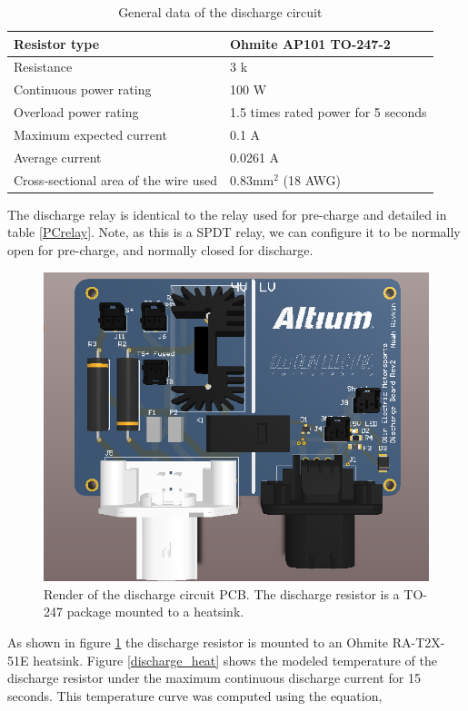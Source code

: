 \documentclass{article}
\begin{document}
	\begin{table}[H]
		\centering
		\begin{tabular}{|l|l|}
		\hline
		Resistor type & Ohmite AP101 TO-247-2 \\ \hline
		Resistance & 3 k\ohm \\ \hline
		Continuous power rating & 100 W \\ \hline
		Overload power rating & 1.5 times rated power for 5 seconds \\ \hline
		Maximum expected current & 0.1 A \\ \hline
		Average current & 0.0261 A\\ \hline
		Cross-sectional area of the wire used & 0.83mm$^2$ (18 AWG) \\ \hline
		\end{tabular}
		\caption{General data of the discharge circuit}
		\label{dctable}
	\end{table}

The discharge relay is identical to the relay used for pre-charge and detailed in table {\ref{PCrelay}}. Note, as this is a SPDT relay, we can configure it to be normally open for pre-charge, and normally closed for discharge.

\begin{figure}[H]
    \centering
    \includegraphics[width = 0.7 \textwidth]{discharge_pcb}
    \caption{Render of the discharge circuit PCB. The discharge resistor is a TO-247 package mounted to a heatsink. }
    \label{discharge_pcb}
\end{figure}

As shown in figure \ref{discharge_pcb} the discharge resistor is mounted to an Ohmite RA-T2X-51E heatsink. Figure \ref{discharge_heat} shows the modeled temperature of the discharge resistor under the maximum continuous discharge current for 15 seconds. This temperature curve was computed using the equation,
\end{document}
